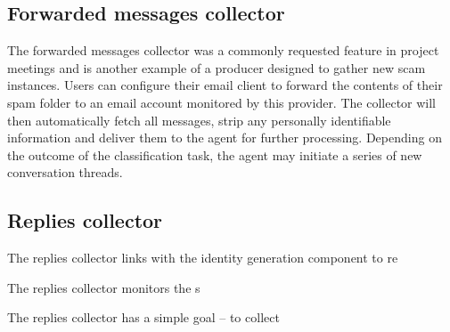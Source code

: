 \subsection{Forwarded messages collector}
The forwarded messages collector was a commonly requested feature in project meetings and is another example of a producer designed to gather new scam instances. Users can configure their email client to forward the contents of their spam folder to an email account monitored by this provider. The collector will then automatically fetch all messages, strip any personally identifiable information and deliver them to the agent for further processing. Depending on the outcome of the classification task, the agent may initiate a series of new conversation threads.

\subsection{Replies collector}
The replies collector links with the identity generation component to re

The replies collector monitors the s


The replies collector has a simple goal -- to collect 